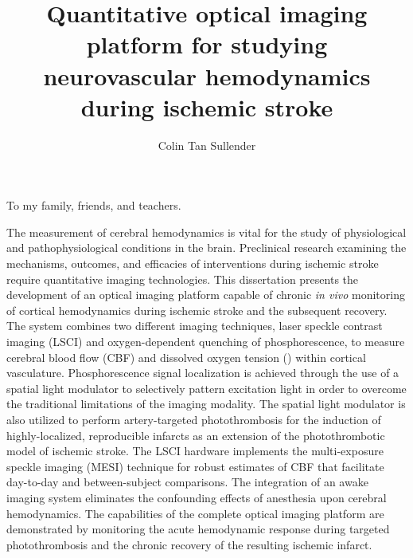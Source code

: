 \documentclass[12pt]{report}
\author{Colin Tan Sullender}
\title{Quantitative optical imaging platform for studying neurovascular hemodynamics during ischemic stroke}
\begin{document}
\copyrightpage      %
\commcertpage       %
\titlepage          %


\begin{dedication}
To my family, friends, and teachers.
\end{dedication}


\begin{acknowledgments}

\blindtext

\end{acknowledgments}


\utabstract
\indent The measurement of cerebral hemodynamics is vital for the study of physiological and pathophysiological conditions in the brain. Preclinical research examining the mechanisms, outcomes, and efficacies of interventions during ischemic stroke require quantitative imaging technologies. This dissertation presents the development of an optical imaging platform capable of chronic \textit{in vivo} monitoring of cortical hemodynamics during ischemic stroke and the subsequent recovery. The system combines two different imaging techniques, laser speckle contrast imaging (LSCI) and oxygen-dependent quenching of phosphorescence, to measure cerebral blood flow (CBF) and dissolved oxygen tension () within cortical vasculature. Phosphorescence signal localization is achieved through the use of a spatial light modulator to selectively pattern excitation light in order to overcome the traditional limitations of the imaging modality. The spatial light modulator is also utilized to perform artery-targeted photothrombosis for the induction of highly-localized, reproducible infarcts as an extension of the photothrombotic model of ischemic stroke. The LSCI hardware implements the multi-exposure speckle imaging (MESI) technique for robust estimates of CBF that facilitate day-to-day and between-subject comparisons. The integration of an awake imaging system eliminates the confounding effects of anesthesia upon cerebral hemodynamics. The capabilities of the complete optical imaging platform are demonstrated by monitoring the acute hemodynamic response during targeted photothrombosis and the chronic recovery of the resulting ischemic infarct.
\end{document}
